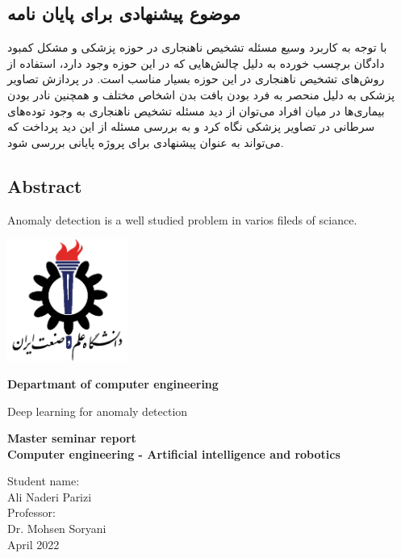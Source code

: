 \documentclass[12pt,a4paper]{report}
\theoremstyle{definition}
\theoremstyle{definition}
\begin{document}
	\section{موضوع پیشنهادی برای پایان نامه}
با توجه به کاربرد وسیع مسئله تشخیص ناهنجاری در حوزه پزشکی و مشکل کمبود دادگان برچسب خورده به دلیل چالش‌هایی که در این حوزه وجود دارد، استفاده از روش‌های تشخیص ناهنجاری در این حوزه بسیار مناسب است. در پردازش تصاویر پزشکی به دلیل منحصر به فرد بودن بافت بدن اشخاص مختلف و همچنین نادر بودن بیماری‌ها در میان افراد می‌توان از دید مسئله تشخیص ناهنجاری به وجود توده‌های سرطانی در تصاویر پزشکی نگاه کرد و به بررسی مسئله از این دید پرداخت که می‌تواند به عنوان پیشنهادی برای پروژه پایانی بررسی شود.
	
	
	\newpage




\printindex
\newpage
\begin{latin}
\chapter*{Abstract}
Anomaly detection is a well studied problem in varios fileds of sciance.

\newpage
\thispagestyle{empty}

	\vspace*{25mm}
	\centerline{\includegraphics[height=4cm]{./images/logos/iust.png}}

	\begin{center}
	\textbf{
Departmant of computer engineering
	}
	\\[1cm]
	\baselineskip=2cm
	{\titr
	\begin{Huge}
	Deep learning for anomaly detection\\[1cm]
	\end{Huge}}
	{\Large 
		\textbf{
			Master seminar report \\
Computer engineering - Artificial intelligence and robotics
		} \\[1cm]
	}

	{\Large { Student name:}
	\\
	{\Large  Ali Naderi Parizi}
	\\[.5cm]
	{\Large  Professor:}
	\\
	{\Large Dr.  Mohsen Soryani}
	\\[.6cm]
	}
April 2022
	\end{center}

\end{latin}
\end{document}
